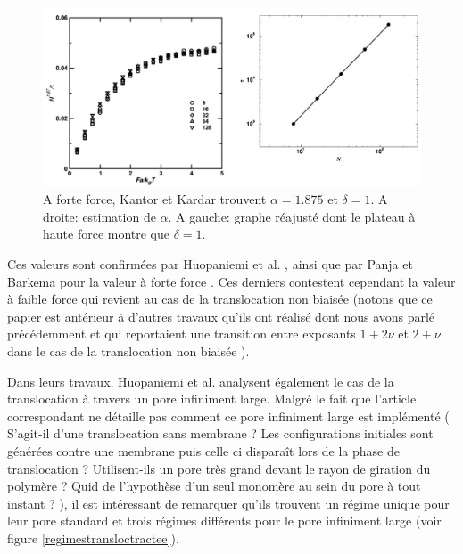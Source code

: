  \begin{figure}[H]
\begin{center}
\includegraphics[width=1\textwidth]{kantorkardar.jpg}
\caption[Exposants critiques pour une translocation tractée]{ A forte force, Kantor et Kardar \cite{Kantor2004} trouvent  $\alpha=1.875$ et $\delta=1$. A droite: estimation de $\alpha$. A gauche: graphe réajusté dont le plateau à haute force montre que $\delta=1$.}
\label{deltakantor}
\end{center}
\end{figure}

Ces valeurs sont confirmées par Huopaniemi et al. \cite{Huopaniemi2007}, ainsi que par Panja et Barkema pour la valeur à forte force \cite{Panja2008}. Ces derniers contestent cependant la valeur à faible force qui revient au cas de la translocation non biaisée (notons que ce papier est antérieur à d'autres travaux qu'ils ont réalisé dont nous avons parlé précédemment et qui reportaient une transition entre exposants $1+2\nu$ et $2+\nu$ dans le cas de la translocation non biaisée \cite{Panja22010}).

 Dans leurs travaux, Huopaniemi et al. \cite{Huopaniemi2007} analysent également le cas de la translocation à travers un pore infiniment large. Malgré le fait que l'article correspondant ne détaille pas comment ce pore infiniment large est implémenté ( S'agit-il d'une translocation sans membrane ? Les configurations initiales sont générées contre une membrane puis celle ci disparaît lors de la phase de translocation ? Utilisent-ils un pore très grand devant le rayon de giration du polymère ? Quid de l'hypothèse d'un seul monomère au sein du pore à tout instant ? ), il est intéressant de remarquer qu'ils trouvent un régime unique pour leur pore standard et trois régimes différents pour le pore infiniment large (voir figure \ref{regimestransloctractee}).

